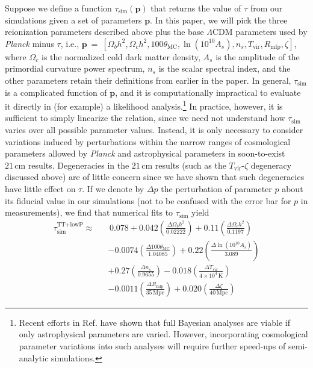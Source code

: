\documentclass[twocolumn,aps,prd,nofootinbib,showpacs,superscriptaddress]{revtex4-1}
\begin{document}
Suppose we define a function $\tau_\textrm{sim} (\mathbf{p})$ that returns the value of $\tau$ from our simulations given a set of parameters $\mathbf{p}$. In this paper, we will pick the three reionization parameters described above plus the base $\Lambda$CDM parameters used by \emph{Planck} minus $\tau$, i.e., $\mathbf{p}~=~\left[ \Omega_b h^2, \Omega_c h^2, 100\theta_\textrm{MC}, \ln ( 10^{10} A_s), n_s, T_\textrm{vir}, R_\textrm{mfp}, \zeta \right]$, where $\Omega_c$ is the normalized cold dark matter density, $A_s$ is the amplitude of the primordial curvature power spectrum, $n_s$ is the scalar spectral index, and the other parameters retain their definitions from earlier in the paper. In general, $\tau_\textrm{sim}$ is a complicated function of $\mathbf{p}$, and it is computationally impractical to evaluate it directly in (for example) a likelihood analysis.\footnote{Recent efforts in Ref. \cite{greig_and_mesinger2015} have shown that full Bayesian analyses are viable if only astrophysical parameters are varied. However, incorporating cosmological parameter variations into such analyses will require further speed-ups of semi-analytic simulations.}  In practice, however, it is sufficient to simply linearize the relation, since we need not understand how $\tau_\textrm{sim}$ varies over all possible parameter values. Instead, it is only necessary to consider variations induced by perturbations within the narrow ranges of cosmological parameters allowed by \emph{Planck} and astrophysical parameters in soon-to-exist $21\,\textrm{cm}$ results. Degeneracies in the $21\,\textrm{cm}$ results (such as the $T_\textrm{vir}$-$\zeta$ degeneracy discussed above) are of little concern since we have shown that such degeneracies have little effect on $\tau$. If we denote by $\Delta p$ the perturbation of parameter $p$ about its fiducial value in our simulations (not to be confused with the error bar for $p$ in measurements), we find that numerical fits to $\tau_\textrm{sim}$ yield
\begin{eqnarray}
\label{eq:TTlowP_linearTau}
\tau_\textrm{sim}^\textrm{TT+lowP} \approx &&\, 0.078 + 0.042 \left(\frac{\Delta\Omega_b h^2}{0.02222}\right) +  0.11\left(\frac{\Delta\Omega_c h^2}{0.1197}\right) \nonumber\\
&& -0.0074 \left(\frac{\Delta100\theta_\textrm{MC}}{1.04085}\right)  + 0.22  \left(\frac{\Delta\ln (10^{10} A_s)}{3.089}\right)\nonumber \\
&& + 0.27 \left(\frac{\Delta n_s}{0.9655}\right) -0.018\left(\frac{\Delta T_\textrm{vir}}{4 \times 10^4\,\textrm{K}}\right)\nonumber \\
&& -0.0011 \left(\frac{\Delta R_\textrm{mfp}}{35\,\textrm{Mpc}}\right) + 0.020 \left(\frac{\Delta \zeta}{40\,\textrm{Mpc}}\right)
\end{eqnarray}
\end{document}
